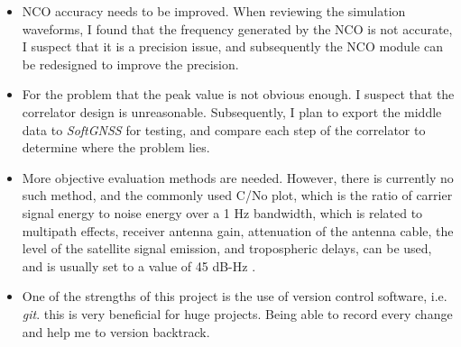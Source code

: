 \begin{itemize}
    \item NCO accuracy needs to be improved. When reviewing the simulation waveforms, I found that the frequency generated by the NCO is not accurate, I suspect that it is a precision issue, and subsequently the NCO module can be redesigned to improve the precision.
    \item For the problem that the peak value is not obvious enough. I suspect that the correlator design is unreasonable. Subsequently, I plan to export the middle data to \textit{SoftGNSS} for testing, and compare each step of the correlator to determine where the problem lies.
    \item More objective evaluation methods are needed. However, there is currently no such method, and the commonly used C/No plot, which is the ratio of carrier signal energy to noise energy over a 1 Hz bandwidth, which is related to multipath effects, receiver antenna gain, attenuation of the antenna cable, the level of the satellite signal emission, and tropospheric delays, can be used, and is usually set to a value of 45 dB-Hz \cite{RN211}.
    \item One of the strengths of this project is the use of version control software, i.e. \textit{git}. this is very beneficial for huge projects. Being able to record every change and help me to version backtrack.
\end{itemize}

